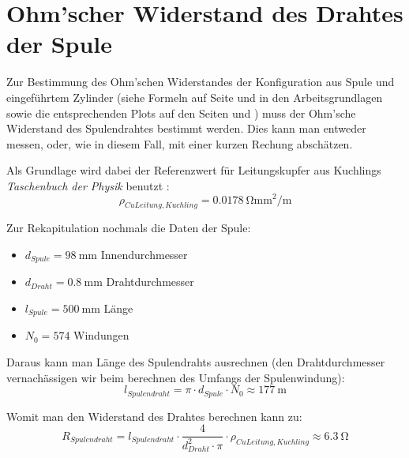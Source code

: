 \clearpage
\section[Widerstand Spulendraht]{Ohm'scher Widerstand des Drahtes der Spule}
\label{app:R_Ohm_0}

Zur   Bestimmung   des   Ohm'schen    Widerstandes   der   Konfiguration   aus
Spule    und    eingef\"uhrtem    Zylinder   (siehe    Formeln    auf    Seite
\pageref{eq:hohlzylinder:LRExact}     und     \pageref{eq:vollzylinder:RExact}
in     den     Arbeitsgrundlagen     sowie    die     entsprechenden     Plots
auf     den     Seiten    \pageref{sec:ausw:subsec:vollz:subsubsec:LR}     und
\pageref{sec:ausw:subsec:hohlz:st:subsubsec:LR}) muss der  Ohm'sche Widerstand
des Spulendrahtes bestimmt werden. Dies kann man entweder messen, oder, wie in
diesem Fall, mit einer kurzen Rechung absch\"atzen.

Als Grundlage wird  dabei der Referenzwert f\"ur  Leitungskupfer aus Kuchlings
\emph{Taschenbuch der Physik} benutzt \cite{ref:kuchling:resistivityTable}:
\begin{equation*}
    \rho_{CuLeitung,Kuchling} = \SI{0.0178}{\ohm\milli\meter\squared\per\meter}
\end{equation*}

Zur Rekapitulation nochmals die Daten der Spule:
\begin{itemize}
   \item
       $d_{Spule} = \SI{98}{\milli\meter}$ Innendurchmesser
   \item
       $d_{Draht} = \SI{0.8}{\milli\meter}$ Drahtdurchmesser
   \item
       $l_{Spule} = \SI{500}{\milli\meter}$ L\"ange
   \item
       $N_0 = \num{574}$ Windungen
\end{itemize}

Daraus  kann man  L\"ange  des Spulendrahts  ausrechnen (den  Drahtdurchmesser
vernach\"assigen wir beim berechnen des Umfangs der Spulenwindung):
\begin{equation*}
    l_{Spulendraht} = \pi \cdot d_{Spule} \cdot N_0 \approx \SI{177}{\meter}
\end{equation*}

Womit man den Widerstand des Drahtes berechnen kann zu:
\begin{equation*}
    R_{Spulendraht} = l_{Spulendraht} \cdot \frac{4}{d_{Draht}^2 \cdot \pi} \cdot \rho_{CuLeitung,Kuchling} \approx \SI{6.3}{\ohm}
\end{equation*}

